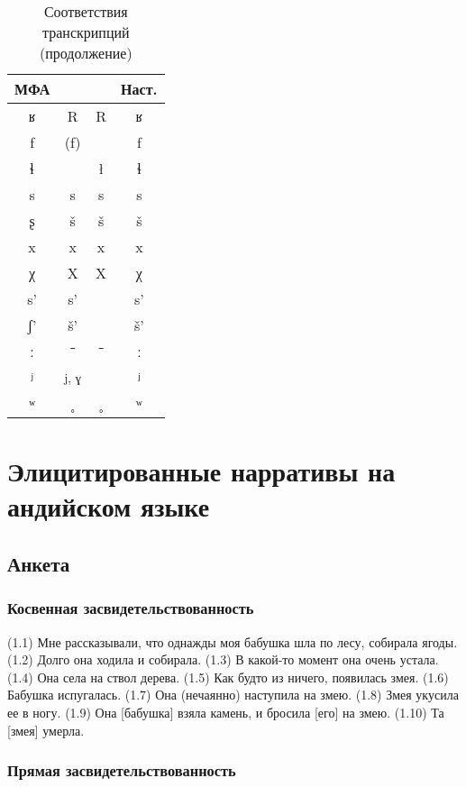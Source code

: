 \begin{appendices}
\pagebreak

\begin{table}[H]
\caption{Соответствия транскрипций (продолжение)}
\vspace{0.3cm}
\centering
\label{tab:transcr2}
\begin{tabular}{cccc}

МФА	&	\citep{tsakhurgram}	&	\citep{bagvalalgram}	&	Наст.	\\ \hline
ʁ	&	R	&	R	&	ʁ	\\
f	&	(f)	&		&	f	\\
ɬ	&		&	ł	&	ɬ	\\
s	&	s	&	s	&	s	\\
ʂ	&	š	&	š	&	š	\\
x	&	x	&	x	&	x	\\
χ	&	X	&	X	&	χ	\\
s’	&	s’	&		&	s’	\\
ʃ’	&	š’	&		&	š’	\\
ː	&	ˉ	&	ˉ	&	ː	\\
ʲ	&	\textsubscript{j, ɣ}	&		&	ʲ	\\
ʷ	&	˳	&	˳	&	ʷ	
\end{tabular}
\end{table}


\chapter{Элицитированные нарративы на андийском языке} \label{app2}

\section{Анкета}

\subsection{Косвенная засвидетельствованность}

(1.1) Мне рассказывали, что однажды моя бабушка шла по лесу, собирала ягоды. (1.2) Долго она ходила и собирала. (1.3) В какой-то момент она очень устала. (1.4) Она села на ствол дерева. (1.5) Как будто из ничего, появилась змея. (1.6) Бабушка испугалась. (1.7) Она (нечаянно) наступила на змею. (1.8) Змея укусила ее в ногу. (1.9) Она [бабушка] взяла камень, и бросила [его] на змею. (1.10) Та [змея] умерла. 

\subsection{Прямая засвидетельствованность}


\end{appendices}
